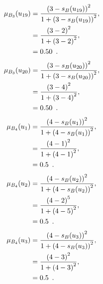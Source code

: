 \documentclass[a4paper,openany]{book}
\begin{document}
				\begin{align}
					\mu_{B_3}(u_{19}) &= \frac{\left(3-s_B(u_{19})\right)^2}{1 + \left(3-s_B(u_{19})\right)^2} ,\\
					&= \frac{\left(3-2\right)^2}{1 + \left(3-2\right)^2} \notag ,\\
					&= 0.50 \enspace. \notag
				\end{align}
				\begin{align}
					\mu_{B_3}(u_{20}) &= \frac{\left(3-s_B(u_{20})\right)^2}{1 + \left(3-s_B(u_{20})\right)^2} ,\\
					&= \frac{\left(3-4\right)^2}{1 + \left(3-4\right)^2} \notag ,\\
					&= 0.50 \enspace. \notag
				\end{align}
				\begin{align}
					\mu_{B_4}(u_1) &= \frac{\left(4-s_B(u_1)\right)^2}{1 + \left(4-s_B(u_1)\right)^2} ,\\
					&= \frac{\left(4-1\right)^2}{1 + \left(4-1\right)^2} \notag ,\\
					&= 0.5 \enspace. \notag
				\end{align}
				\begin{align}
					\mu_{B_4}(u_2) &= \frac{\left(4-s_B(u_2)\right)^2}{1 + \left(4-s_B(u_2)\right)^2} ,\\
					&= \frac{\left(4-2\right)^5}{1 + \left(4-5\right)^2} \notag ,\\
					&= 0.5 \enspace. \notag
				\end{align}
				\begin{align}
					\mu_{B_4}(u_3) &= \frac{\left(4-s_B(u_3)\right)^2}{1 + \left(4-s_B(u_3)\right)^2} ,\\
					&= \frac{\left(4-3\right)^2}{1 + \left(4-3\right)^2} \notag ,\\
					&= 0.5 \enspace. \notag
				\end{align}
\end{document}
